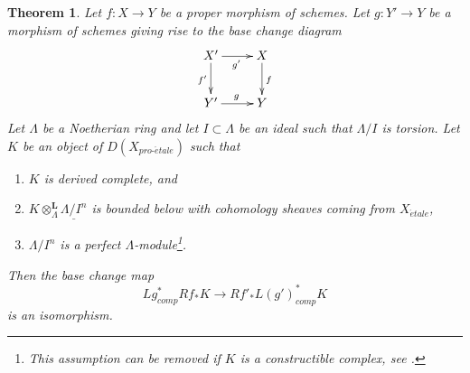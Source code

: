 \documentclass{stacks-project}
\theoremstyle{plain}
\newtheorem{theorem}[subsection]{Theorem}
\theoremstyle{definition}
\theoremstyle{remark}
\numberwithin{equation}{subsection}
\def\proetale{{pro\text{-}\acute{e}tale}}
\def\etale{{\acute{e}tale}}
\begin{document}
\begin{theorem}
\label{theorem-proper-base-change}
Let $f : X \to Y$ be a proper morphism of schemes. Let $g : Y' \to Y$ be
a morphism of schemes giving rise to the base change diagram
$$
\xymatrix{
X' \ar[r]_{g'} \ar[d]_{f'} & X \ar[d]^f \\
Y' \ar[r]^g & Y
}
$$
Let $\Lambda$ be a Noetherian ring and let $I \subset \Lambda$ be an ideal
such that $\Lambda/I$ is torsion. Let $K$ be an object
of $D(X_\proetale)$ such that
\begin{enumerate}
\item $K$ is derived complete, and
\item $K \otimes_\Lambda^\mathbf{L} \underline{\Lambda/I^n}$ is
bounded below with cohomology sheaves coming from $X_\etale$,
\item $\Lambda/I^n$ is a perfect $\Lambda$-module\footnote{This assumption
can be removed if $K$ is a constructible complex, see \cite{BS}.}.
\end{enumerate}
Then the base change map
$$
Lg_{comp}^*Rf_*K \longrightarrow Rf'_*L(g')^*_{comp}K
$$
is an isomorphism.
\end{theorem}
\end{document}
